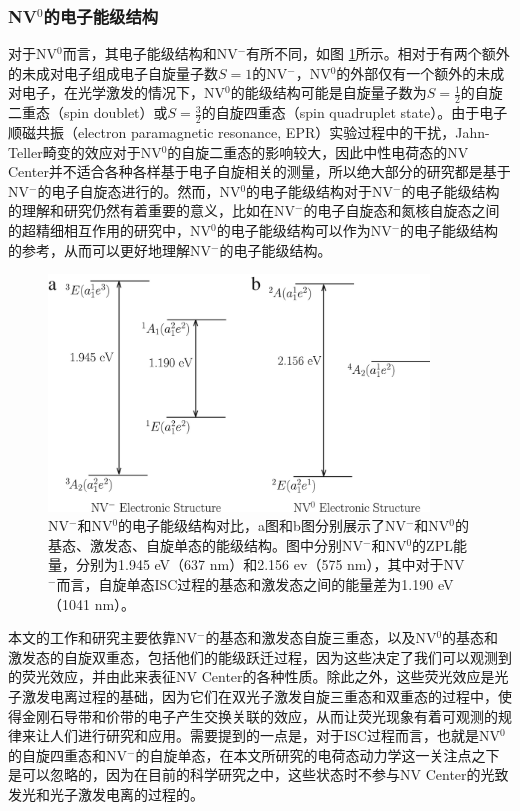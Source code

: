 \documentclass[type = bachelor, oneside]{whu-thesis}
\begin{document}
\subsubsection{NV$^0$的电子能级结构}
对于NV$^0$而言，其电子能级结构和NV$^-$有所不同，如图 \ref{fig: NV0 Electronic Structure}所示。相对于有两个额外的未成对电子组成电子自旋量子数$S=1$的NV$^-$，NV$^0$的外部仅有一个额外的未成对电子，在光学激发的情况下，NV$^0$的能级结构可能是自旋量子数为$S=\frac{1}{2}$的自旋二重态（spin doublet）或$S=\frac{3}{2}$的自旋四重态（spin quadruplet state）。由于电子顺磁共振（electron paramagnetic resonance, EPR）实验过程中的干扰，Jahn-Teller畸变的效应对于NV$^0$的自旋二重态的影响较大，因此中性电荷态的NV Center并不适合各种各样基于电子自旋相关的测量，所以绝大部分的研究都是基于NV$^-$的电子自旋态进行的\cite{Gali2009a}。然而，NV$^0$的电子能级结构对于NV$^-$的电子能级结构的理解和研究仍然有着重要的意义，比如在NV$^-$的电子自旋态和氮核自旋态之间的超精细相互作用的研究中，NV$^0$的电子能级结构可以作为NV$^-$的电子能级结构的参考，从而可以更好地理解NV$^-$的电子能级结构\cite{Gali2009a}。

\begin{figure}
  \centering
  \includegraphics[width=0.9\textwidth]{figures/Chapter 2/NV0 Electronic Structure.jpg}
  \caption[NV$^-$和NV$^0$的电子能级结构对比]{NV$^-$和NV$^0$的电子能级结构对比，a图和b图分别展示了NV$^-$和NV$^0$的基态、激发态、自旋单态的能级结构。图中分别NV$^-$和NV$^0$的ZPL能量，分别为1.945 eV（637 nm）和2.156 ev（575 nm），其中对于NV$^-$而言，自旋单态ISC过程的基态和激发态之间的能量差为1.190 eV（1041 nm）\cite{Doherty2013}。}
  \label{fig: NV0 Electronic Structure}
\end{figure}

本文的工作和研究主要依靠NV$^-$的基态和激发态自旋三重态，以及NV$^0$的基态和激发态的自旋双重态，包括他们的能级跃迁过程，因为这些决定了我们可以观测到的荧光效应，并由此来表征NV Center的各种性质。除此之外，这些荧光效应是光子激发电离过程的基础，因为它们在双光子激发自旋三重态和双重态的过程中，使得金刚石导带和价带的电子产生交换关联的效应，从而让荧光现象有着可观测的规律来让人们进行研究和应用\cite{Aslam2013}。需要提到的一点是，对于ISC过程而言，也就是NV$^0$的自旋四重态和NV$^-$的自旋单态，在本文所研究的电荷态动力学这一关注点之下是可以忽略的，因为在目前的科学研究之中，这些状态时不参与NV Center的光致发光和光子激发电离的过程的。
\end{document}
